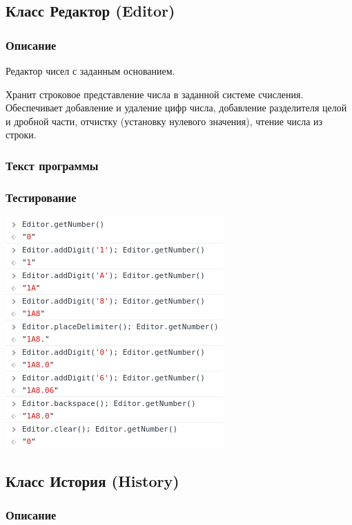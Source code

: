 \documentclass[oneside, final, 10pt]{extarticle}
\begin{document}
\subsection{Класс Редактор (Editor)}

\subsubsection{Описание}

Редактор чисел с заданным основанием.

Хранит строковое представление числа в заданной системе счисления. Обеспечивает добавление и удаление цифр числа, добавление разделителя целой и дробной части, отчистку (установку нулевого значения), чтение числа из строки.

\subsubsection{Текст программы}

\lstset{caption=editor.js}


\subsubsection{Тестирование}
\includegraphics{./screen/test_editor}

\subsection{Класс История (History)}

\subsubsection{Описание}
\end{document}
